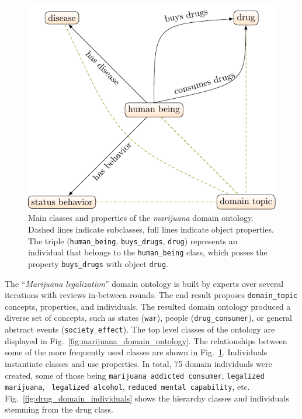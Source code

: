 \begin{figure}
	\centering
	\footnotesize
	\includegraphics{formalizations_marijuana_main_classes-figure0.pdf}
\caption{Main classes and properties of the \textit{marijuana} domain 
ontology. 
Dashed lines indicate subclasses, full lines indicate object properties. 
The triple (\texttt{human\_being}, \texttt{buys\_drugs}, \texttt{drug}) represents an 
individual that belongs to the
\texttt{human\_being} class, which posses the property \texttt{buys\_drugs} with 
object \texttt{drug}.
} 
\label{fig:main-classes}
\end{figure}

The ``\emph{Marijuana legalization}'' domain ontology is built by experts over
several iterations with reviews in-between rounds. The end result proposes 
\texttt{domain\_topic} concepts, properties, and individuals. The resulted
domain ontology produced a diverse set of concepts, such as states (\texttt{war}),
people (\texttt{drug\_consumer}), or general abstract events (\texttt{society\_effect}). 
The top level classes of the ontology are displayed in 
Fig.~\ref{fig:marijuana_domain_ontology}. The relationships between some of the more frequently
used classes are shown in Fig.~\ref{fig:main-classes}. 
Individuals instantiate classes
and use properties. In total, 75 domain individuals were created, some of those
being \texttt{marijuana addicted consumer}, \texttt{legalized marijuana}, \texttt{
legalized alcohol}, \texttt{reduced mental capability}, etc. 
Fig.~\ref{fig:drug_domain_individuals} shows the hierarchy classes and 
individuals stemming from the drug class. 

